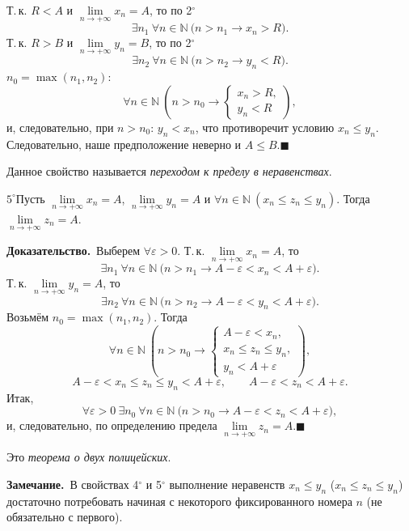 \documentclass[a4paper,11pt]{article}
\newcommand{\zam}{\textbf{Замечание.}\ }
\newcommand{\dok}{\textbf{Доказательство.}\ }
\newcommand{\qedr}{\hfill$\blacksquare$}
\begin{document}
Т.\,к. $R < A$ и $\lim\limits_{n \to +\infty} x_n = A$, то по 2$^\circ$
\[
  \exists n_1\ \forall n \in \mathbb{N}\ \big(n > n_1 \to x_n > R\big).
\]
Т.\,к. $R > B$ и $\lim\limits_{n \to +\infty} y_n = B$, то по 2$^\circ$
\[
  \exists n_2\ \forall n \in \mathbb{N}\ \big(n > n_2 \to y_n < R\big).
\]
$n_0 = \max(n_1, n_2)$:
\[
  \forall n \in \mathbb{N}\ \left(n > n_0 \to
  \begin{cases} x_n > R,\\ y_n < R \end{cases}\right),
\]
и, следовательно, при $n > n_0$: $y_n < x_n$, что противоречит условию
$x_n \le y_n$. Следовательно, наше предположение неверно и $A \le B$.\qedr

Данное свойство называется \emph{переходом к пределу в неравенствах}.

\begin{svoi}{$5^\circ$}Пусть $\lim\limits_{n \to +\infty} x_n = A$,
$\lim\limits_{n \to +\infty} y_n = A$ и
$\forall n \in \mathbb{N}\ (x_n \le z_n \le y_n)$. Тогда
$\lim\limits_{n \to +\infty} z_n = A$.
\end{svoi}

\dok Выберем $\forall \varepsilon > 0$. Т.\,к.
$\lim\limits_{n \to +\infty} x_n = A$, то
\[
  \exists n_1\ \forall n \in \mathbb{N}\ \big(n > n_1 \to A - \varepsilon < x_n < A + \varepsilon\big).
\]
Т.\,к. $\lim\limits_{n \to +\infty} y_n = A$, то
\[
  \exists n_2\ \forall n \in \mathbb{N}\ \big(n > n_2 \to A - \varepsilon < y_n < A + \varepsilon\big).
\]
Возьмём $n_0 = \max(n_1, n_2)$. Тогда
\[
  \forall n \in \mathbb{N}\ \left(n > n_0 \to
  \begin{cases} A - \varepsilon < x_n,\\ x_n \le z_n \le y_n,\\ y_n < A + \varepsilon \end{cases}\right),
\]
\[
  A - \varepsilon < x_n \le z_n \le y_n < A + \varepsilon, \qquad
  A - \varepsilon < z_n < A + \varepsilon.
\]
Итак,
\[
  \forall \varepsilon > 0\ \exists n_0\ \forall n \in \mathbb{N}\
  \big(n > n_0 \to A - \varepsilon < z_n < A + \varepsilon\big),
\]
и, следовательно, по определению предела
$\lim\limits_{n \to +\infty} z_n = A$.\qedr

Это \emph{теорема о двух полицейских}.

\zam В свойствах 4$^\circ$ и 5$^\circ$ выполнение неравенств
$x_n \le y_n$ ($x_n \le z_n \le y_n$) достаточно потребовать начиная
с некоторого фиксированного номера $n$ (не обязательно с первого).
\end{document}
